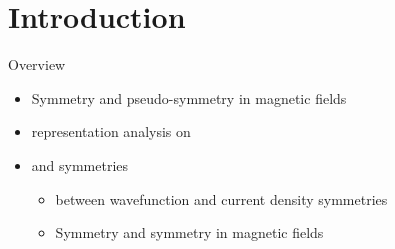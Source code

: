 \section{Introduction}

  \begin{frame}{Overview}
    \begin{itemize}
      \item Symmetry and pseudo-symmetry  in magnetic fields
      \item {} representation analysis on 
      \item {} and  symmetries
      \begin{itemize}
        \item {} between wavefunction and current density symmetries
        \item Symmetry  and symmetry  in magnetic fields
      \end{itemize}
    \end{itemize}
  \end{frame}